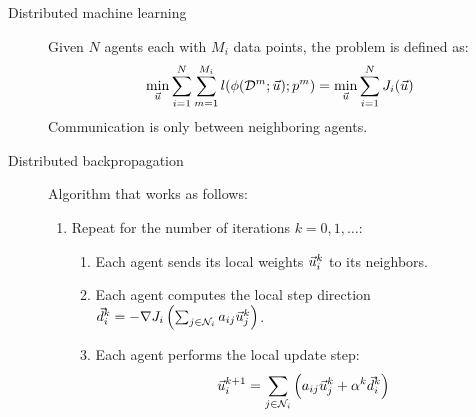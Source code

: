 \begin{description}
    \item[Distributed machine learning] 
        Given $N$ agents each with $M_i$ data points, the problem is defined as:
        \[ \min_{\vec{u}} \sum_{i=1}^{N} \sum_{m=1}^{M_i} l(\phi(\mathcal{D}^m; {\vec{u}}); p^m) = \min_{\vec{u}} \sum_{i=1}^{N} J_i({\vec{u}}) \]
        Communication is only between neighboring agents.

    \item[Distributed backpropagation] 
        Algorithm that works as follows:
        \begin{enumerate}
            \item Repeat for the number of iterations $k = 0, 1, \dots$:
            \begin{enumerate}
                \item Each agent sends its local weights ${\vec{u}}_i^k$ to its neighbors.
                \item Each agent computes the local step direction $\vec{d}_i^k = -\nabla J_i\left( \sum_{j \in \mathcal{N}_i} a_{ij}{\vec{u}}_j^k \right)$.
                \item Each agent performs the local update step:
                \[ {\vec{u}}_i^{k+1} = \sum_{j \in \mathcal{N}_i} \left( a_{ij} {\vec{u}}_j^k + \alpha^k \vec{d}_i^k \right) \]
            \end{enumerate}
        \end{enumerate}
\end{description}
